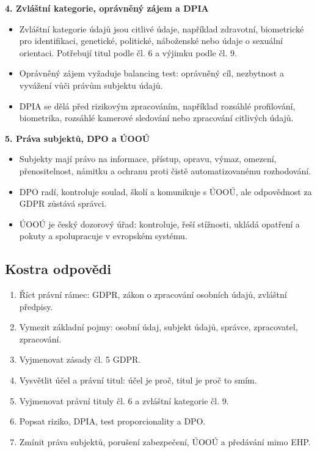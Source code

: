 \textbf{4. Zvláštní kategorie, oprávněný zájem a DPIA}
\begin{itemize}
  \item Zvláštní kategorie údajů jsou citlivé údaje, například zdravotní, biometrické pro identifikaci, genetické, politické, náboženské nebo údaje o sexuální orientaci. Potřebují titul podle čl. 6 a výjimku podle čl. 9.
  \item Oprávněný zájem vyžaduje balancing test: oprávněný cíl, nezbytnost a vyvážení vůči právům subjektu údajů.
  \item DPIA se dělá před rizikovým zpracováním, například rozsáhlé profilování, biometrika, rozsáhlé kamerové sledování nebo zpracování citlivých údajů.
\end{itemize}

\textbf{5. Práva subjektů, DPO a ÚOOÚ}
\begin{itemize}
  \item Subjekty mají právo na informace, přístup, opravu, výmaz, omezení, přenositelnost, námitku a ochranu proti čistě automatizovanému rozhodování.
  \item DPO radí, kontroluje soulad, školí a komunikuje s ÚOOÚ, ale odpovědnost za GDPR zůstává správci.
  \item ÚOOÚ je český dozorový úřad: kontroluje, řeší stížnosti, ukládá opatření a pokuty a spolupracuje v evropském systému.
\end{itemize}

\subsection*{Kostra odpovědi}
\begin{enumerate}
  \item Říct právní rámec: GDPR, zákon o zpracování osobních údajů, zvláštní předpisy.
  \item Vymezit základní pojmy: osobní údaj, subjekt údajů, správce, zpracovatel, zpracování.
  \item Vyjmenovat zásady čl. 5 GDPR.
  \item Vysvětlit účel a právní titul: účel je proč, titul je proč to smím.
  \item Vyjmenovat právní tituly čl. 6 a zvláštní kategorie čl. 9.
  \item Popsat riziko, DPIA, test proporcionality a DPO.
  \item Zmínit práva subjektů, porušení zabezpečení, ÚOOÚ a předávání mimo EHP.
\end{enumerate}

